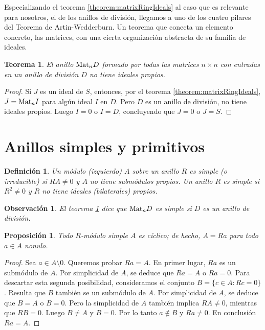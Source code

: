 \documentclass{report}
\newcommand{\Mat}{\textnormal{Mat}}
\newtheorem{theorem}{Teorema}
\newtheorem{proposition}{Proposición}
\newtheorem{definition}{Definición}
\newtheorem{remark}{Observación}
\begin{document}
  Especializando el teorema \ref{theorem:matrixRingIdeals} al caso que es relevante para nosotros, el de los anillos de división, llegamos a uno de los cuatro pilares del Teorema de Artin-Wedderburn.
  Un teorema que conecta un elemento concreto, las matrices, con una cierta organización abstracta de su familia de ideales.

  \begin{theorem}\label{theorem:idealsInTheRingOfMatricesOverADivisionRing}
    El anillo \(\Mat_n D\) formado por todas las matrices \(n \times n\) con entradas en un anillo de división \(D\) no tiene ideales propios.
  \end{theorem}
  \begin{proof}
    Si \(J\) es un ideal de \(S\), entonces, por el teorema \ref{theorem:matrixRingIdeals}, \(J = \Mat_n I\) para algún ideal \(I\) en \(D\).
    Pero \(D\) es un anillo de división, no tiene ideales propios.
    Luego \(I = 0\) o \(I = D\), concluyendo que \(J = 0\) o \(J = S\).
  \end{proof}

  \section{Anillos simples y primitivos}

  \begin{definition}
    Un módulo (izquierdo) \(A\) sobre un anillo \(R\) es \emph{simple} (o \emph{irreducible}) si \(R A \neq 0\) y \(A\) no tiene submódulos propios.
    Un anillo \(R\) es \emph{simple} si \(R^2 \neq 0\) y \(R\) no tiene ideales (bilaterales) propios.
  \end{definition}

  \begin{remark}
    El teorema \ref{theorem:idealsInTheRingOfMatricesOverADivisionRing} dice que \(\Mat_n D\) es simple si \(D\) es un anillo de división.
  \end{remark}

  \begin{proposition}\label{proposition:simpleModulesAreCiclic}
    Todo \(R\)-módulo simple \(A\) es cíclico; de hecho, \(A = R a\) para todo \(a \in A\) nonulo.
  \end{proposition}
  \begin{proof}
    Sea \(a \in A \setminus 0\).
    Queremos probar \(R a = A\).
    En primer lugar, \(R a\) es un submódulo de \(A\).
    Por simplicidad de \(A\), se deduce que \(R a = A\) o \(R a = 0\).
    Para descartar esta segunda posibilidad, consideramos el conjunto \(B = \{c \in A : R c = 0\}\).
    Resulta que \(B\) también se un submódulo de \(A\).
    Por simplicidad de \(A\), se deduce que \(B = A\) o \(B = 0\).
    Pero la simplicidad de \(A\) también implica \(R A \neq 0\), mientras que \(R B = 0\).
    Luego \(B \neq A\) y \(B = 0\).
    Por lo tanto \(a \notin B\) y \(R a \neq 0\).
    En conclusión \(R a = A\).
  \end{proof}
\end{document}
